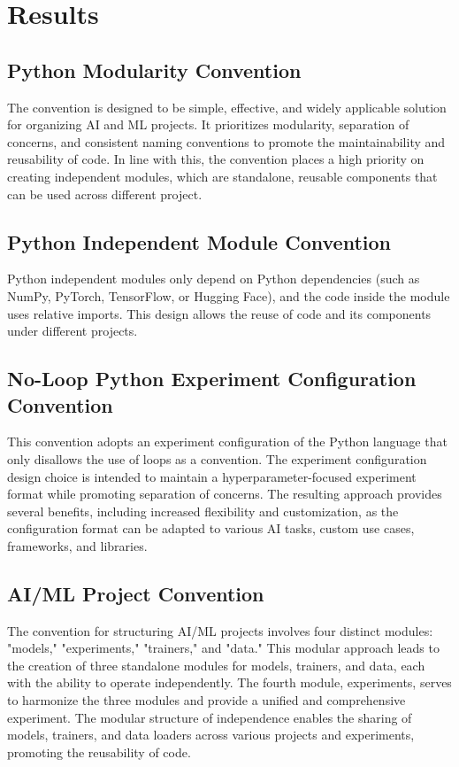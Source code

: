 
\section{Results}


\subsection{Python Modularity Convention}
The convention is designed to be simple, effective, and widely applicable solution for organizing AI and ML projects. It prioritizes modularity, separation of concerns, and consistent naming conventions to promote the maintainability and reusability of code. In line with this, the convention places a high priority on creating independent modules, which are standalone, reusable components that can be used across different project.

\subsection{Python Independent Module Convention}
Python independent modules only depend on Python dependencies (such as NumPy, PyTorch, TensorFlow, or Hugging Face), and the code inside the module uses relative imports. This design allows the reuse of code and its components under different projects. 



\subsection{No-Loop Python Experiment Configuration Convention}

This convention adopts an experiment configuration of the Python language that only disallows the use of loops as a convention. The experiment configuration design choice is intended to maintain a hyperparameter-focused experiment format while promoting separation of concerns. The resulting approach provides several benefits, including increased flexibility and customization, as the configuration format can be adapted to various AI tasks, custom use cases, frameworks, and libraries. 



\subsection{AI/ML Project Convention}
The convention for structuring AI/ML projects involves four distinct modules: "models," "experiments," "trainers," and "data." This modular approach leads to the creation of three standalone modules for models, trainers, and data, each with the ability to operate independently. The fourth module, experiments, serves to harmonize the three modules and provide a unified and comprehensive experiment. The modular structure of independence enables the sharing of models, trainers, and data loaders across various projects and experiments, promoting the reusability of code.




